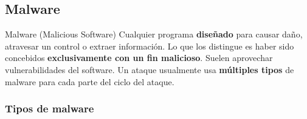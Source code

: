 \documentclass[../main.tex]{subfiles}
\begin{document}
\subsection{Malware}

\begin{definicion}{Malware (Malicious Software)}
Cualquier programa \textbf{diseñado} para causar daño, atravesar un control o
extraer información. Lo que los distingue es haber sido concebidos
\textbf{exclusivamente con un fin malicioso}. Suelen aprovechar vulnerabilidades del
software. Un ataque usualmente usa \textbf{múltiples tipos} de malware para cada
parte del ciclo del ataque.
\end{definicion}

\subsubsection{Tipos de malware}
\end{document}
